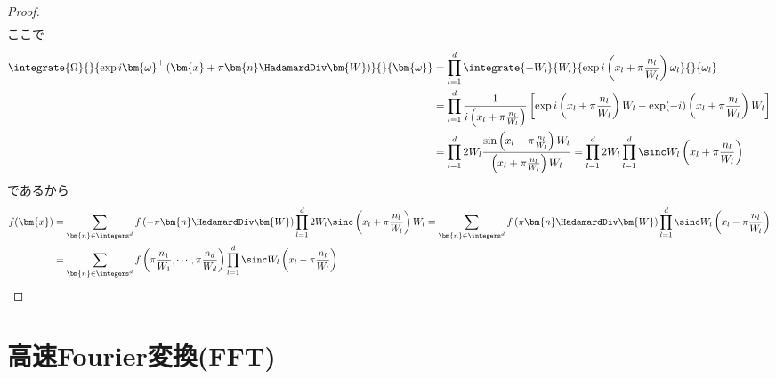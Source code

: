 \begin{proof}
\begin{align*}
			\end{align*}
			ここで
			\begin{align*}
				\integrate{\Omega}{}{\exp i \bm{\omega}^\top\left(\bm{x} + \pi\bm{n}\HadamardDiv\bm{W}\right) }{}{\bm{\omega}} &= \prod_{l=1}^d \integrate{-W_l}{W_l}{\exp i\left(x_l + \pi\frac{n_l}{W_l}\right)\omega_l}{}{\omega_l} \\
				&= \prod_{l=1}^d \frac{1}{i\left(x_l + \pi\frac{n_l}{W_l}\right)}\left[\exp i\left(x_l + \pi\frac{n_l}{W_l}\right)W_l - \exp (-i)\left(x_l + \pi\frac{n_l}{W_l}\right)W_l\right] \\
				&= \prod_{l=1}^d 2W_l \frac{\sin \left(x_l + \pi\frac{n_l}{W_l}\right)W_l}{\left(x_l + \pi\frac{n_l}{W_l}\right)W_l} = \prod_{l=1}^d 2W_l \prod_{l=1}^d \sinc W_l\left(x_l + \pi\frac{n_l}{W_l}\right)
			\end{align*}
			であるから
			\begin{align*}
				f(\bm{x}) &= \sum_{\bm{n}\in\integers^d} f\left(-\pi\bm{n}\HadamardDiv\bm{W}\right) \prod_{l=1}^d 2W_l \sinc \left(x_l + \pi\frac{n_l}{W_l}\right)W_l = \sum_{\bm{n}\in\integers^d} f\left(\pi\bm{n}\HadamardDiv\bm{W}\right) \prod_{l=1}^d \sinc W_l\left(x_l - \pi\frac{n_l}{W_l}\right) \\
				&= \sum_{\bm{n}\in\integers^d} f\left(\pi\frac{n_1}{W_1},\cdots,\pi\frac{n_d}{W_d}\right) \prod_{l=1}^d \sinc W_l\left(x_l - \pi\frac{n_l}{W_l}\right)
			\end{align*}
		\end{proof}
	\chapter{高速Fourier変換(FFT)}
